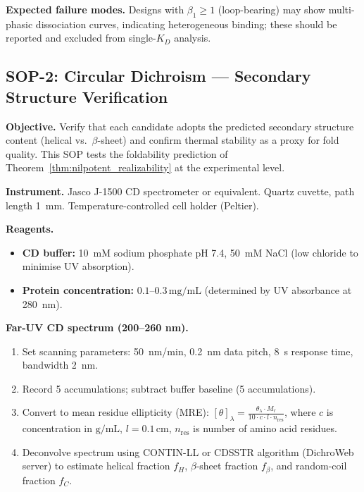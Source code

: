 \noindent\textbf{Expected failure modes.}  Designs with $\beta_1 \ge 1$
(loop-bearing) may show multi-phasic dissociation curves, indicating
heterogeneous binding; these should be reported and excluded from
single-$K_D$ analysis.

\subsection{SOP-2: Circular Dichroism --- Secondary Structure Verification}
\label{subsec:sop2_cd}

\noindent\textbf{Objective.}  Verify that each candidate adopts the predicted
secondary structure content (helical vs.\ $\beta$-sheet) and confirm thermal
stability as a proxy for fold quality.  This SOP tests the foldability
prediction of Theorem~\ref{thm:nilpotent_realizability} at the experimental
level.

\noindent\textbf{Instrument.}  Jasco J-1500 CD spectrometer or equivalent.
Quartz cuvette, path length 1~mm.  Temperature-controlled cell holder
(Peltier).

\noindent\textbf{Reagents.}
\begin{itemize}[leftmargin=1.2cm]
  \item \textbf{CD buffer:} 10~mM sodium phosphate pH 7.4, 50~mM NaCl
        (low chloride to minimise UV absorption).
  \item \textbf{Protein concentration:} $0.1$--$0.3\,\mathrm{mg/mL}$
        (determined by UV absorbance at 280~nm).
\end{itemize}

\noindent\textbf{Far-UV CD spectrum (200--260 nm).}
\begin{enumerate}[leftmargin=1.5cm, label=\arabic*.]
  \item Set scanning parameters: 50~nm/min, 0.2~nm data pitch, 8~s response
        time, bandwidth 2~nm.
  \item Record 5 accumulations; subtract buffer baseline (5 accumulations).
  \item Convert to mean residue ellipticity (MRE):
        $[\theta]_{\lambda} = \frac{\theta_{\lambda} \cdot M_r}{10 \cdot c
        \cdot l \cdot n_{\text{res}}}$, where $c$ is concentration in
        $\mathrm{g/mL}$, $l = 0.1\,\mathrm{cm}$, $n_{\text{res}}$ is number
        of amino acid residues.
  \item Deconvolve spectrum using CONTIN-LL or CDSSTR algorithm
        (DichroWeb server) to estimate helical fraction $f_H$,
        $\beta$-sheet fraction $f_\beta$, and random-coil fraction $f_C$.
\end{enumerate}

